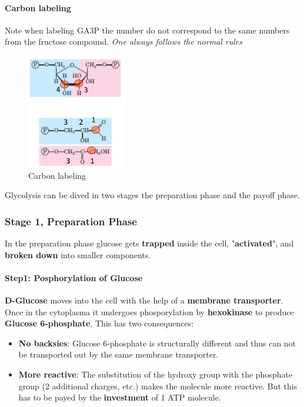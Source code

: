 \documentclass[../main.tex]{subfiles}
\begin{document}
\paragraph{Carbon labeling}
Note when labeling GA3P the number do not correspond to the same numbers from the fructose compound. \textit{One always follows the normal rules}
\begin{figure}[H]
	\centering
	\includegraphics[height = 5cm]{labeling}
	\caption{Carbon labeling}
\end{figure}

Glycolysis can be dived in two stages the preparation phase and the payoff phase. 

\subsubsection{Stage 1, Preparation Phase}
In the preparation phase glucose gets \textbf{trapped} inside the cell, "\textbf{activated}", and \textbf{broken down} into smaller components.  
\paragraph{Step1: Posphorylation of Glucose}
\textbf{D-Glucose} moves into the cell with the help of a \textbf{membrane transporter}. Once in the cytoplasma it undergoes phosporylation by \textbf{hexokinase} to produce \textbf{Glucose 6-phosphate}. This has two consequences: 
\begin{itemize}
	\item \textbf{No backsies}: Glucose 6-phosphate is structurally different and thus can not be transported out by the same membrane transporter. 
	\item \textbf{More reactive}: The substitution of the hydroxy group with the phosphate group (2 additional charges, etc.) makes the molecule more reactive. But this has to be payed by the \textbf{investment} of 1 ATP molecule.
\end{itemize}
\end{document}

